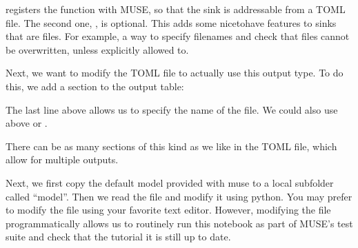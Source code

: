 \documentclass[letterpaper,10pt,english]{sphinxmanual}
\begin{document}
 registers the function with MUSE, so that the sink is addressable from a TOML file. The second one, , is optional. This adds some nice\sphinxhyphen{}to\sphinxhyphen{}have features to sinks that are files. For example, a way to specify filenames and check that files cannot be overwritten, unless explicitly allowed to.

Next, we want to modify the TOML file to actually use this output type. To do this, we add a section to the output table:

\begin{sphinxVerbatim}[commandchars=\\\{\}]
  
  
  
\end{sphinxVerbatim}

The last line above allows us to specify the name of the file. We could also use  above or .

There can be as many sections of this kind as we like in the TOML file, which allow for multiple outputs.

Next, we first copy the default model provided with muse to a local subfolder called “model”. Then we read the  file and modify it using python. You may prefer to modify the  file using your favorite text editor. However, modifying the file programmatically allows us to routinely run this notebook as part of MUSE’s test suite and check that the tutorial it is still up to date.
\end{document}
